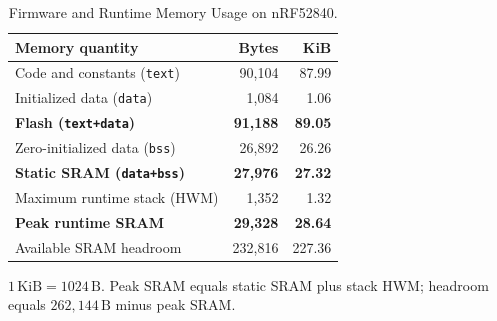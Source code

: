 \begin{table}[tbh]
\centering
\caption{Firmware and Runtime Memory Usage on nRF52840.}
\label{tab:firmware_memory}
\footnotesize
\setlength{\tabcolsep}{4pt}
\begin{tabular}{@{}lrr@{}}
\toprule
\textbf{Memory quantity} & \textbf{Bytes} & \textbf{KiB} \\
\midrule
Code and constants (\texttt{text}) & 90,104 & 87.99 \\
Initialized data (\texttt{data}) & 1,084 & 1.06 \\
\textbf{Flash (\texttt{text+data})} & \textbf{91,188} & \textbf{89.05} \\
Zero-initialized data (\texttt{bss}) & 26,892 & 26.26 \\
\textbf{Static SRAM (\texttt{data+bss})} & \textbf{27,976} & \textbf{27.32} \\
Maximum runtime stack (HWM) & 1,352 & 1.32 \\
\textbf{Peak runtime SRAM} & \textbf{29,328} & \textbf{28.64} \\
Available SRAM headroom & 232,816 & 227.36 \\
\bottomrule
\end{tabular}
\par\smallskip
\parbox{\columnwidth}{\footnotesize
$1\,\mathrm{KiB}=1024\,\mathrm{B}$.
Peak SRAM equals static SRAM plus stack HWM; headroom equals $262{,}144\,\mathrm{B}$ minus peak SRAM.}
\end{table}
